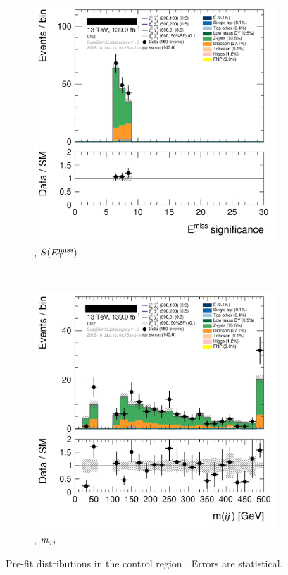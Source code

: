 \begin{figure}[tp]
\centering
\begin{subfigure}{0.62\textwidth}
\centering
\includegraphics[width=\textwidth]{figures/2ljets_def_met_Sign_CRZ.png}
\caption{\crz, $S(E_\mathrm{T}^\mathrm{miss})$}
\end{subfigure}
\\
\begin{subfigure}{0.62\textwidth}
\centering
\includegraphics[width=\textwidth]{figures/2ljets_def_mjj_CRZ.png}
\caption{\crz, $m_{jj}$}
\end{subfigure}
\caption[
Pre-fit distributions in the control region CR-Z
]{%
Pre-fit distributions in the control region \crz.
Errors are statistical.
}
\label{fig:2ljets_low_cr_region}
\end{figure}

